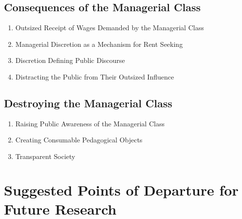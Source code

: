 \documentclass[12pt]{article}
\begin{document}
\subsection{Consequences of the Managerial Class}
\begin{enumerate}
    \item Outsized Receipt of Wages Demanded by the Managerial Class
    \item Managerial Discretion as a Mechanism for Rent Seeking
    \item Discretion Defining Public Discourse
    \item Distracting the Public from Their Outsized Influence
\end{enumerate}
\subsection{Destroying the Managerial Class}
\begin{enumerate}
    \item Raising Public Awareness of the Managerial Class
    \item Creating Consumable Pedagogical Objects
    \item Transparent Society
\end{enumerate}

\section{Suggested Points of Departure for Future Research}
\end{document}
